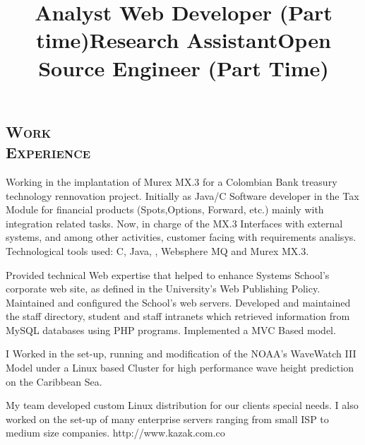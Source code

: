\begin{resume}
\section{\textsc{Work\\ Experience}}

\title{\textbf{Analyst} }
\begin{position}
Working in the implantation of Murex MX.3 for a Colombian Bank treasury
technology rennovation project. Initially as Java/C Software
developer in the Tax Module for financial products (Spots,Options,
Forward, etc.) mainly with
integration related tasks. Now, in charge of the MX.3 Interfaces with
external systems, and among other activities, customer facing with
requirements analisys. Technological tools used:
C, Java, \CSharp,  Websphere MQ and Murex MX.3.
\end{position}


\title{\textbf{Web Developer} (Part time)}
\begin{position}
Provided technical Web expertise that helped to enhance Systems School's corporate web site, 
as defined in the University's Web Publishing Policy. Maintained and configured the School's web servers. Developed and maintained the staff directory, student and staff intranets which retrieved information from MySQL databases using PHP programs. Implemented a MVC Based model.
\end{position}

\title{\textbf{Research Assistant}}
\begin{position}
I Worked in the set-up, running and modification of the NOAA's WaveWatch III Model under a Linux based Cluster
for high performance wave height prediction on the Caribbean Sea.
\end{position}


\title{\textbf{Open Source Engineer} (Part Time)}
\begin{position}
My team developed custom  Linux distribution for our clients
special needs. I also worked on  the set-up of many enterprise
servers ranging from small ISP to medium size companies. http://www.kazak.com.co
\end{position}



\end{resume}
